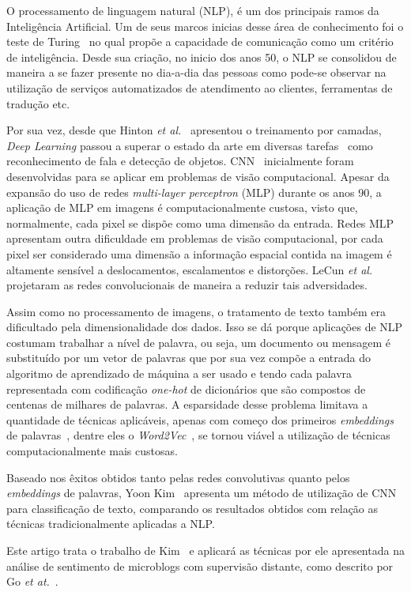 O processamento de linguagem natural (NLP), é um dos principais ramos da Inteligência Artificial.
Um de seus marcos inicias desse área de conhecimento foi o teste de Turing~\cite{turing50} no qual propõe a capacidade de
comunicação como um critério de inteligência.
Desde sua criação, no inicio dos anos 50, o NLP se consolidou de maneira a se fazer presente no dia-a-dia das pessoas como
pode-se observar na utilização de serviços automatizados de atendimento ao clientes, ferramentas de tradução etc.

Por sua vez, desde que Hinton \textit{et al.}~\cite{hinton06} apresentou o treinamento por camadas, \textit{Deep Learning}
passou a superar o estado da arte em diversas tarefas~\cite{lecun15} como reconhecimento de fala e detecção de objetos.
CNN~\cite{lecun98} inicialmente foram desenvolvidas para se aplicar em problemas de visão computacional.
Apesar da expansão do uso de redes \textit{multi-layer perceptron} (MLP) durante os anos 90, a aplicação de MLP em imagens
é computacionalmente custosa, visto que, normalmente, cada pixel se dispõe como uma dimensão da entrada.
Redes MLP apresentam outra dificuldade em problemas de visão computacional, por cada pixel ser considerado uma dimensão a
informação espacial contida na imagem é altamente sensível a deslocamentos, escalamentos e distorções.
LeCun \textit{et al.}~\cite{lecun98} projetaram as redes convolucionais de maneira a reduzir tais adversidades.

Assim como no processamento de imagens, o tratamento de texto também era dificultado pela dimensionalidade dos dados.
Isso se dá porque aplicações de NLP costumam trabalhar a nível de palavra, ou seja, um documento ou mensagem é substituído
por um vetor de palavras que por sua vez compõe a entrada do algoritmo de aprendizado de máquina a ser usado e tendo
cada palavra representada com codificação \textit{one-hot} de dicionários que são compostos de centenas de milhares de
palavras.
A esparsidade desse problema limitava a quantidade de técnicas aplicáveis, apenas com começo dos primeiros \textit{embeddings}
de palavras~\cite{bengio03}, dentre eles o \textit{Word2Vec}~\cite{mikolov13}, se tornou viável a utilização de técnicas
computacionalmente mais custosas.

Baseado nos êxitos obtidos tanto pelas redes convolutivas quanto pelos \textit{embeddings} de palavras, Yoon Kim~\cite{kim14}
apresenta um método de utilização de CNN para classificação de texto, comparando os resultados obtidos com relação as técnicas
tradicionalmente aplicadas a NLP.

Este artigo trata o trabalho de Kim~\cite{kim14} e aplicará as técnicas por ele apresentada na análise de sentimento de
microblogs com supervisão distante, como descrito por Go \textit{et at.}~\cite{go09}.
